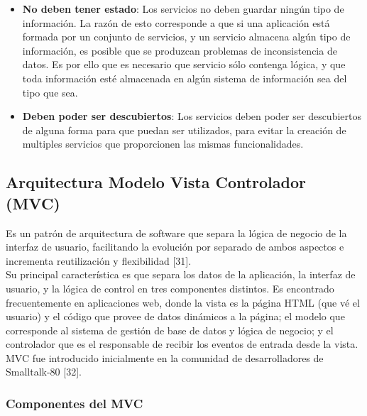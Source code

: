 \begin{itemize}
 \item \textbf{No deben tener estado}: Los servicios no deben guardar ningún tipo de información. La razón de esto corresponde a que si
    una aplicación está formada por un conjunto de servicios, y un servicio almacena algún tipo de información, es posible que se produzcan 
    problemas de inconsistencia de datos. Es por ello que es necesario que servicio sólo contenga lógica, y que toda información esté 
    almacenada en algún sistema de información sea del tipo que sea.

 \item \textbf{Deben poder ser descubiertos}: Los servicios deben poder ser descubiertos de alguna forma para que puedan ser utilizados, 
    para evitar la creación de multiples servicios que proporcionen las mismas funcionalidades. 
\end{itemize}



\subsection{Arquitectura Modelo Vista Controlador (MVC)}

Es un patrón de arquitectura de software que separa la lógica de negocio de la interfaz de usuario, facilitando la 
evolución por separado de ambos aspectos e incrementa reutilización y flexibilidad [31].\\

Su principal característica es que separa los datos de la aplicación, la interfaz de usuario, y la lógica de control en tres componentes 
distintos. Es encontrado frecuentemente en aplicaciones web, donde la vista es la página HTML (que vé el usuario) y el código que provee 
de datos dinámicos a la página; el modelo que corresponde  al sistema de gestión de base de datos y lógica de negocio; y el controlador 
que es el responsable de recibir los eventos de entrada desde la vista.\\

MVC fue introducido inicialmente en la comunidad de desarrolladores de Smalltalk-80 [32].\\


\subsubsection{Componentes del MVC}

